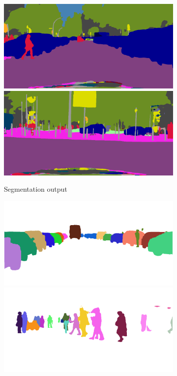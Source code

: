 \begin{figure}[p]
{{\begin{subfigure}[t]{0.24\linewidth}
\begin{center}
		\includegraphics[width=\linewidth,trim={0px 60px 0 0px},clip]{results/segnet_45_output_1.png}
		\includegraphics[width=\linewidth,trim={0px 60px 0 0px},clip]{results/segnet_19_output_1.png}
  \caption{Segmentation output}
\end{center}
\end{subfigure}
\begin{subfigure}[t]{0.24\linewidth}
\begin{center}
		\includegraphics[width=\linewidth,trim={0px 60px 0 0px},clip]{results/segnet_18_output_3.png}
		\includegraphics[width=\linewidth,trim={0px 60px 0 0px},clip]{results/segnet_20_output_3.png}

\end{center}
\end{subfigure}}}
\end{figure}
